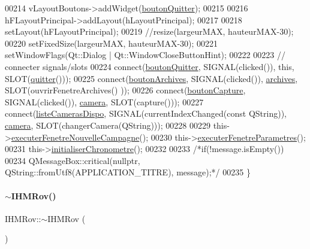 \begin{DoxyCode}
00214     vLayoutBoutons->addWidget(\hyperlink{class_i_h_m_rov_a75b93974e71e86a6a14ea1bc47fa7bd8}{boutonQuitter});
00215 
00216     hFLayoutPrincipal->addLayout(hLayoutPrincipal);
00217 
00218     setLayout(hFLayoutPrincipal);
00219     \textcolor{comment}{//resize(largeurMAX, hauteurMAX-30);}
00220     setFixedSize(largeurMAX, hauteurMAX-30);
00221     setWindowFlags(Qt::Dialog | Qt::WindowCloseButtonHint);
00222 
00223     \textcolor{comment}{// connecter signals/slots}
00224     connect(\hyperlink{class_i_h_m_rov_a75b93974e71e86a6a14ea1bc47fa7bd8}{boutonQuitter}, SIGNAL(clicked()), \textcolor{keyword}{this}, SLOT(\hyperlink{class_i_h_m_rov_a6446087033d8ead72d16451b4a29c44e}{quitter}()));
00225     connect(\hyperlink{class_i_h_m_rov_a1a0c3460e0b9e9c4a1adc54f7f229307}{boutonArchives}, SIGNAL(clicked()), \hyperlink{class_i_h_m_rov_a1e64353d7244219599c46450bb84e1df}{archives}, SLOT(ouvrirFenetreArchives()
      ));
00226     connect(\hyperlink{class_i_h_m_rov_a149c634582225cff29b6c8555eb7ba85}{boutonCapture}, SIGNAL(clicked()), \hyperlink{class_i_h_m_rov_a0eda0e4726269508d4563d98064dca9d}{camera}, SLOT(capture()));
00227     connect(\hyperlink{class_i_h_m_rov_a9b9e5631b8d9b6a9801a6faac8cba0f0}{listeCamerasDispo}, SIGNAL(currentIndexChanged(\textcolor{keyword}{const} QString)), 
      \hyperlink{class_i_h_m_rov_a0eda0e4726269508d4563d98064dca9d}{camera}, SLOT(changerCamera(QString)));
00228 
00229     this->\hyperlink{class_i_h_m_rov_a3169e8cd9132ece69af974648066c6c1}{executerFenetreNouvelleCampagne}();
00230     this->\hyperlink{class_i_h_m_rov_a2ec97de9b75c073c6a4dd0792a284002}{executerFenetreParametres}();
00231     this->\hyperlink{class_i_h_m_rov_a64002e867300c8aff2ebd4568acc107e}{initialiserChronometre}();
00232 
00233     \textcolor{comment}{/*if(!message.isEmpty())}
00234 \textcolor{comment}{        QMessageBox::critical(nullptr, QString::fromUtf8(APPLICATION\_TITRE), message);*/}
00235 \}
\end{DoxyCode}
\mbox{\label{class_i_h_m_rov_ab861463889934a3b6083b7a29c6adf45}} 
\paragraph{\texorpdfstring{$\sim$\+I\+H\+M\+Rov()}{~IHMRov()}}
{\footnotesize\ttfamily I\+H\+M\+Rov\+::$\sim$\+I\+H\+M\+Rov (\begin{DoxyParamCaption}{ }\end{DoxyParamCaption})}




